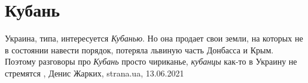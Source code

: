  
 
 
 
 
\chapter{Кубань}
\label{sec:slova.kubanj}

Украина, типа, интересуется \emph{Кубанью}. Но она продает свои земли, на которых не в
состоянии навести порядок, потеряла львиную часть Донбасса и Крым. Поэтому
разговоры про \emph{Кубань} просто чириканье, \emph{кубанцы} как-то в Украину не стремятся
, 
Денис Жарких, strana.ua, 13.06.2021

